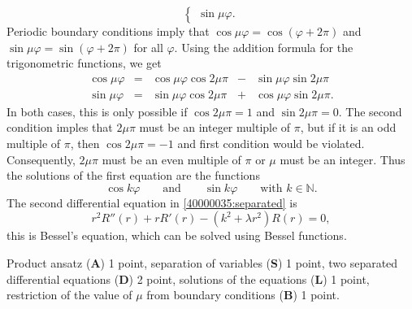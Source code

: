 \begin{loesung}
\[\begin{cases}
\sin \mu \varphi.
\end{cases}
\]
Periodic boundary conditions imply that
$\cos\mu\varphi=\cos(\varphi+2\pi)$
and
$\sin\mu\varphi=\sin(\varphi+2\pi)$
for all $\varphi$.
Using the addition formula for the trigonometric functions, we get
\[
\renewcommand{\arraycolsep}{2pt}
\begin{array}{rcrcl}
\cos\mu\varphi &=& \cos\mu\varphi\cos 2\mu\pi &-& \sin\mu\varphi\sin2\mu\pi
\\
\sin\mu\varphi &=& \sin\mu\varphi\cos 2\mu\pi &+& \cos\mu\varphi\sin2\mu\pi.
\end{array}
\]
In both cases, this is only possible if $\cos2\mu\pi=1$ and
$\sin2\mu\pi=0$.
The second condition imples that $2\mu\pi$ must be an integer
multiple of $\pi$, but if it is an odd multiple of $\pi$, then
$\cos2\mu\pi=-1$ and first condition would be violated.
Consequently, $2\mu\pi$ must be an even multiple of $\pi$ or $\mu$
must be an integer.
Thus the solutions of the first equation are the functions
\[
\cos k\varphi
\qquad\text{and}\qquad
\sin k\varphi
\qquad\text{with $k\in\mathbb{N}$.}
\]
The second differential equation in \eqref{40000035:separated} is 
\[
r^2R''(r)
+
r R'(r)
-
(k^2+\lambda r^2)R(r)
=
0,
\]
this is Bessel's equation, which can be solved using Bessel functions.
\end{loesung}

\begin{bewertung}
Product ansatz ({\bf A}) 1 point,
separation of variables ({\bf S}) 1 point,
two separated differential equations ({\bf D}) 2 point,
solutions of the equations ({\bf L}) 1 point,
restriction of the value of $\mu$ from boundary conditions ({\bf B}) 1 point.
\end{bewertung}

